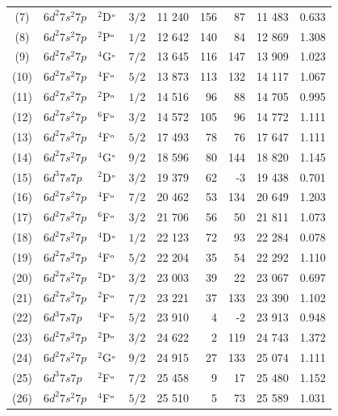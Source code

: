 \documentclass[8pt,a4paper, twoside]{report}
\begin{document}
\begin{table}[p!]
\begin{adjustwidth}{-1.3cm}{-1.3cm}
\begin{tabular}{cllcrrrrr}
(7)  & $6d^2 7s^2 7p$  &  $^2$D$^{\rm_o}$  & $3/2$ &  11 240 & 156 &  87 & 11 483 &  0.633 \\ 
(8)  &   $6d^2 7s^2 7p$  &  $^2$P$^{\rm_o}$ &  $1/2$ &  12 642 & 140 &  84  & 12 869 & 1.308 \\ 
(9)  &  $6d^2 7s^2 7p$  &  $^4$G$^{\rm_o}$ &  $7/2$  &  13 645 &  116 &  147 & 13 909 & 1.023 \\ 
(10)   &  $6d^2 7s^2 7p$  &  $^4$F$^{\rm_o}$  & $5/2$ &  13 873 & 113  &  132 & 14 117 & 1.067 \\ 
(11)   &  $6d^2 7s^2 7p$  &  $^2$P$^{\rm_o}$  & $1/2$ &  14 516 & 96  &  88  & 14 705 & 0.995 \\ 
(12)   &  $6d^2 7s^2 7p$  &  $^6$F$^{\rm_o}$  & $3/2$ &  14 572 & 105 & 96  & 14 772 & 1.111 \\ 
(13)   &  $6d^2 7s^2 7p$  &  $^4$F$^{\rm_o}$ &  $5/2$ &  17 493 & 78 &76  & 17 647 & 1.111 \\ 
(14)  &  $6d^2 7s^2 7p$  &  $^4$G$^{\rm_o}$  & $9/2$ &  18 596 & 80 &  144  & 18 820  & 1.145 \\ 
(15)  & $6d^3 7s 7p$  &  $^2$D$^{\rm_o}$  & $3/2$ &  19 379 & 62 &  -3  & 19 438 & 0.701 \\ 
 (16)  &  $6d^2 7s^2 7p$  &  $^4$F$^{\rm_o}$ &  $7/2$  &  20 462 & 53 & 134 & 20 649  & 1.203 \\ 
(17)  &  $6d^2 7s^2 7p$  &  $^6$F$^{\rm_o}$  & $3/2$ &  21 706 & 56  & 50 & 21 811 & 1.073 \\ 
(18)  &  $6d^2 7s^2 7p$  &  $^4$D$^{\rm_o}$ &  $1/2$ &  22 123 & 72  & 93 & 22 284 & 0.078 \\ 
(19)   &  $6d^2 7s^2 7p$  &  $^4$F$^{\rm_o}$ &  $5/2$ &  22 204 & 35  & 54 & 22 292 & 1.110 \\ 
(20)  &  $6d^2 7s^2 7p$  &  $^2$D$^{\rm_o}$  & $3/2$ &  23 003 & 39 & 22 & 23 067 & 0.697 \\ 
(21)  &  $6d^2 7s^2 7p$  &  $^2$F$^{\rm_o}$ &  $7/2$  &  23 221 & 37   & 133 & 23 390 & 1.102 \\ 
(22)  &  $6d^3 7s 7p$  &  $^4$F$^{\rm_o}$  & $5/2$ &  23 910 &  4 &  -2 & 23 913 & 0.948 \\ 
(23) &   $6d^2 7s^2 7p$  &  $^2$P$^{\rm_o}$ &  $3/2$ &  24 622 & 2  &  119  & 24 743  & 1.372 \\ 
(24)  &   $6d^2 7s^2 7p$  &  $^2$G$^{\rm_o}$  & $9/2$ &  24 915&  27  & 133 & 25 074 & 1.111 \\ 
 (25)  & $6d^3 7s 7p$  &  $^2$F$^{\rm_o}$ &  $7/2$  &  25 458 & 9  & 17  & 25 480 & 1.152 \\ 
(26) &   $6d^2 7s^2 7p$  &  $^4$F$^{\rm_o}$ &  $5/2$ &  25 510 & 5   & 73 & 25 589 & 1.031 \\ 

\end{tabular}
\end{adjustwidth}
\end{table}
\end{document}
